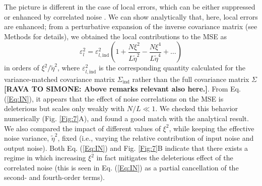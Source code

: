 \documentclass[a4paper]{article}%
\begin{document}
The picture is different in the case of local errors, which can be either
suppressed or enhanced by correlated noise \cite{daSilveira2021ThePopulations}%
. We can show analytically that, here, local errors are enhanced; from a
perturbative expansion of the inverse covariance matrix (see Methods for
details), we obtained the local contributions to the MSE as
\begin{equation}
\varepsilon_{l}^{2}=\varepsilon_{l,\text{ind}}^{2}\left(  1+\frac{N\xi^{2}%
}{L\tilde{\eta}^{2}}-\frac{N\xi^{4}}{L\tilde{\eta}^{4}}+\ldots\right)
\label{Eq:IN}%
\end{equation}
in orders of $\xi^{2}/\tilde{\eta}^{2}$, where $\varepsilon_{l,\text{ind}}%
^{2}$ is the corresponding quantity calculated for the variance-matched
covariance matrix $\Sigma_{\text{ind}}$ rather than the full covariance matrix
$\Sigma$ \textbf{[RAVA TO SIMONE: Above remarks relevant also here.]}. From
Eq. (\ref{Eq:IN}), it appears that the effect of noise correlations on the MSE
is deleterious but scales only weakly with $N/L\ll1$. We checked this behavior
numerically (Fig. \ref{Fig:7}A), and found a good match with the analytical
result. We also compared the impact of different values of $\xi^{2}$, while
keeping the effective noise variance, $\tilde{\eta}^{2}$, fixed (i.e., varying
the relative contribution of input noise and output noise). Both Eq.
(\ref{Eq:IN}) and Fig. \ref{Fig:7}B indicate that there exists a regime in
which increasing $\xi^{2}$ in fact mitigates the deleterious effect of the
correlated noise (this is seen in Eq. (\ref{Eq:IN}) as a partial cancellation
of the second- and fourth-order terms).
\end{document}

